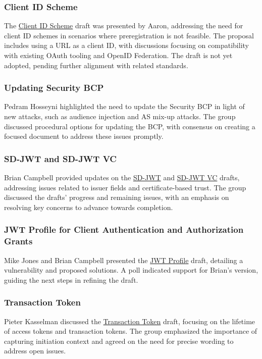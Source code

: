 \documentclass{article}
\begin{document}
\subsubsection{Client ID Scheme}
The \href{https://datatracker.ietf.org/doc/draft-parecki-oauth-client-id-scheme/}{Client ID Scheme} draft was presented by Aaron, addressing the need for client ID schemes in scenarios where preregistration is not feasible. The proposal includes using a URL as a client ID, with discussions focusing on compatibility with existing OAuth tooling and OpenID Federation. The draft is not yet adopted, pending further alignment with related standards.

\subsubsection{Updating Security BCP}
Pedram Hosseyni highlighted the need to update the Security BCP in light of new attacks, such as audience injection and AS mix-up attacks. The group discussed procedural options for updating the BCP, with consensus on creating a focused document to address these issues promptly.

\subsubsection{SD-JWT and SD-JWT VC}
Brian Campbell provided updates on the \href{https://datatracker.ietf.org/doc/draft-ietf-oauth-selective-disclosure-jwt/}{SD-JWT} and \href{https://datatracker.ietf.org/doc/draft-ietf-oauth-sd-jwt-vc/}{SD-JWT VC} drafts, addressing issues related to issuer fields and certificate-based trust. The group discussed the drafts' progress and remaining issues, with an emphasis on resolving key concerns to advance towards completion.

\subsubsection{JWT Profile for Client Authentication and Authorization Grants}
Mike Jones and Brian Campbell presented the \href{https://datatracker.ietf.org/doc/draft-ietf-oauth-rfc7523bis/}{JWT Profile} draft, detailing a vulnerability and proposed solutions. A poll indicated support for Brian's version, guiding the next steps in refining the draft.

\subsubsection{Transaction Token}
Pieter Kasselman discussed the \href{https://datatracker.ietf.org/doc/draft-ietf-oauth-transaction-tokens/}{Transaction Token} draft, focusing on the lifetime of access tokens and transaction tokens. The group emphasized the importance of capturing initiation context and agreed on the need for precise wording to address open issues.
\end{document}
